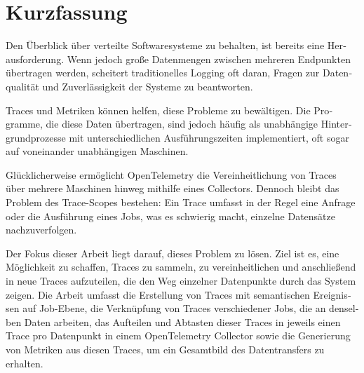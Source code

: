 \chapter{Kurzfassung}

\begin{german}
    Den Überblick über verteilte Softwaresysteme zu behalten, ist bereits eine Herausforderung.
    Wenn jedoch große Datenmengen zwischen mehreren Endpunkten übertragen werden,
    scheitert traditionelles Logging oft daran, Fragen zur Datenqualität und Zuverlässigkeit 
    der Systeme zu beantworten.
    
    Traces und Metriken können helfen, diese Probleme zu bewältigen.
    Die Programme, die diese Daten übertragen, sind jedoch häufig als
    unabhängige Hintergrundprozesse mit unterschiedlichen Ausführungszeiten
    implementiert, oft sogar auf voneinander unabhängigen Maschinen.
    
    Glücklicherweise ermöglicht OpenTelemetry die Vereinheitlichung von Traces über mehrere Maschinen
    hinweg mithilfe eines Collectors.
    Dennoch bleibt das Problem des Trace-Scopes bestehen:
    Ein Trace umfasst in der Regel eine Anfrage oder die Ausführung eines Jobs,
    was es schwierig macht, einzelne Datensätze nachzuverfolgen.
    
    Der Fokus dieser Arbeit liegt darauf, dieses Problem zu lösen.
    Ziel ist es, eine Möglichkeit zu schaffen, Traces zu sammeln, zu vereinheitlichen
    und anschließend in neue Traces aufzuteilen, die den Weg einzelner Datenpunkte durch das System zeigen.
    Die Arbeit umfasst die Erstellung von Traces mit semantischen Ereignissen auf
    Job-Ebene, die Verknüpfung von Traces verschiedener Jobs, die an denselben Daten arbeiten,
    das Aufteilen und Abtasten dieser Traces in jeweils einen Trace pro Datenpunkt in einem OpenTelemetry Collector
    sowie die Generierung von Metriken aus diesen Traces, um ein Gesamtbild des Datentransfers zu erhalten.
\end{german}
